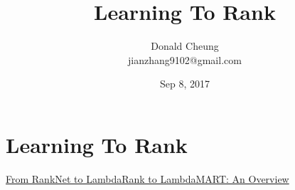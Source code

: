 \documentclass[10pt,a4paper]{ctexbook}
\begin{document}
    \setlength{\baselineskip}{20pt}
    \title{Learning To Rank}
    \author{Donald Cheung\\jianzhang9102@gmail.com}
    \date{Sep 8, 2017}
    \maketitle
    \tableofcontents
\fi

\chapter{Learning To Rank}
\href{https://www.microsoft.com/en-us/research/wp-content/uploads/2016/02/MSR-TR-2010-82.pdf}{From RankNet to LambdaRank to LambdaMART: An Overview}


\ifx\mlbook\undefined
    
\end{document}
